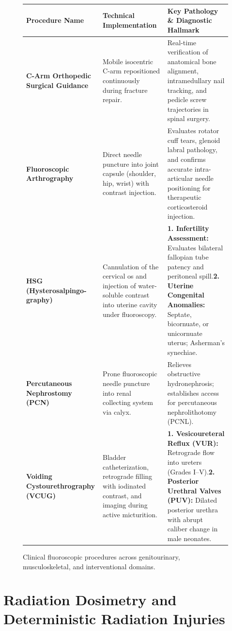 \documentclass[11pt,a4paper]{article}
\begin{document}
\begin{figure}[htbp]
\centering
\setlength{\tabcolsep}{4pt}
\begin{tabular}{p{3.8cm}p{5.4cm}p{5.4cm}}
\toprule
\textbf{Procedure Name} & \textbf{Technical Implementation} & \textbf{Key Pathology \& Diagnostic Hallmark} \\
\midrule
\textbf{C-Arm Orthopedic Surgical Guidance} & Mobile isocentric C-arm repositioned continuously during fracture repair. & Real-time verification of anatomical bone alignment, intramedullary nail tracking, and pedicle screw trajectories in spinal surgery. \\
\addlinespace
\textbf{Fluoroscopic Arthrography} & Direct needle puncture into joint capsule (shoulder, hip, wrist) with contrast injection. & Evaluates rotator cuff tears, glenoid labral pathology, and confirms accurate intra-articular needle positioning for therapeutic corticosteroid injection. \\
\addlinespace
\textbf{HSG (Hysterosalpingo-}\newline\textbf{graphy)} & Cannulation of the cervical os and injection of water-soluble contrast into uterine cavity under fluoroscopy. & \textbf{1. Infertility Assessment:} Evaluates bilateral fallopian tube patency and peritoneal spill.\newline \textbf{2. Uterine Congenital Anomalies:} Septate, bicornuate, or unicornuate uterus; Asherman's synechiae. \\
\addlinespace
\textbf{Percutaneous Nephrostomy (PCN)} & Prone fluoroscopic needle puncture into renal collecting system via calyx. & Relieves obstructive hydronephrosis; establishes access for percutaneous nephrolithotomy (PCNL). \\
\addlinespace
\textbf{Voiding Cystourethrography (VCUG)} & Bladder catheterization, retrograde filling with iodinated contrast, and imaging during active micturition. & \textbf{1. Vesicoureteral Reflux (VUR):} Retrograde flow into ureters (Grades I--V).\newline \textbf{2. Posterior Urethral Valves (PUV):} Dilated posterior urethra with abrupt caliber change in male neonates. \\
\bottomrule
\end{tabular}
\caption{Clinical fluoroscopic procedures across genitourinary, musculoskeletal, and interventional domains.}
\label{tab:interventional_procedures}
\end{figure}

\section{Radiation Dosimetry and Deterministic Radiation Injuries}
\end{document}
